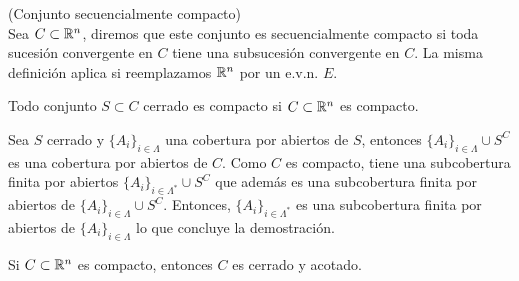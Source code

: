 
\begin{definicion}{\rm (Conjunto secuencialmente compacto)}
\\Sea $C\subset \mathbb{R}^n$, diremos que este conjunto es secuencialmente compacto si toda sucesi\'on convergente en $C$ tiene una subsucesi\'on convergente en $C$. La misma definici\'on aplica si reemplazamos $\mathbb{R}^n$ por un e.v.n. $E$.
\end{definicion}

\begin{teorema}\label{cerrado-en-compacto-es-compacto}
Todo conjunto $S\subset C$ cerrado es compacto si $C\subset \mathbb{R}^n$ es compacto.
\end{teorema}

\begin{demostracion} Sea $S$ cerrado y $\{A_i\}_{i\in \Lambda}$ una cobertura por abiertos de $S$, entonces $\{A_i\}_{i\in \Lambda}  \cup S^C$ es una cobertura por abiertos de $C$. Como $C$ es compacto, tiene una subcobertura finita por abiertos $\{A_i\}_{i\in \Lambda^*}  \cup S^C$ que adem\'as es una subcobertura finita por abiertos de $\{A_i\}_{i\in \Lambda}  \cup S^C$. Entonces, $\{A_i\}_{i\in \Lambda^*}$ es una subcobertura finita por abiertos de $\{A_i\}_{i\in \Lambda}$ lo que concluye la demostraci\'on.
\end{demostracion}

\begin{teorema}\label{compacto-es-cerrado-y-acotado}
Si $C\subset \mathbb{R}^n$ es compacto, entonces $C$ es cerrado y acotado.
\end{teorema}

